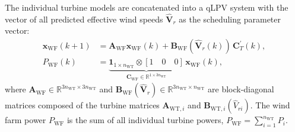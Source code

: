 The individual turbine models are concatenated into a qLPV system with the vector of all predicted effective wind speeds $\hat{\bm{V}}_r$ as the scheduling parameter vector:
\begin{align} \label{eqLinWFAIC}
    \bm{x}_{\text{WF}}(k+1) &= \bm{A}_{\text{WF}} \bm{x}_{\text{WF}}(k) + \bm{B}_{\text{WF}}(\hat{\bm{V}}_r(k)) \, \bm{C}_{T}^\prime(k),\\
    P_{\text{WF}}(k) & = \underbrace{\bm{1}_{1 \times n_{\text{WT}} } \otimes [1 \quad 0 \quad 0]}_{\bm{C}_{\text{WF}} \in {\mathbb{R}}^{1 \times 3n_\text{WT}}} \, \bm{x}_{\text{WF}}(k), \label{eqLinWFAIC2}
\end{align}
where $\bm{A}_{\text{WF}} \in {\mathbb{R}}^{3n_\text{WT} \times 3n_\text{WT}}$ and $\bm{B}_{\text{WF}}(\hat{\bm{V}}_r) \in {\mathbb{R}}^{3n_\text{WT} \times n_\text{WT}}$ are block-diagonal matrices composed of the turbine matrices $\bm{A}_{\text{WT},i}$ and $\bm{B}_{\text{WT},i}(\hat{V}_{ri})$. The wind farm power $P_{\text{WF}}$ is the sum of all individual turbine powers, $P_{\text{WF}} = \sum_{i=1}^{n_{\text{WT}}} P_i$.

